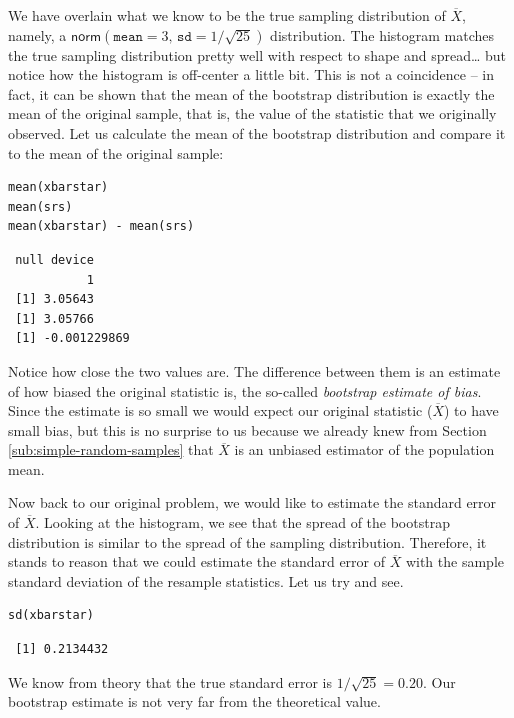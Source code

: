 \documentclass[captions=tableheading]{scrbook}
\begin{document}
\begin{example}
We have overlain what we know to be the true sampling distribution of \(\overline{X}\), namely, a \(\mathsf{norm}(\mathtt{mean}=3,\,\mathtt{sd}=1/\sqrt{25})\) distribution. The histogram matches the true sampling distribution pretty well with respect to shape and spread\ldots{} but notice how the histogram is off-center a little bit. This is not a coincidence -- in fact, it can be shown that the mean of the bootstrap distribution is exactly the mean of the original sample, that is, the value of the statistic that we originally observed. Let us calculate the mean of the bootstrap distribution and compare it to the mean of the original sample:


\begin{verbatim}
mean(xbarstar)
mean(srs)
mean(xbarstar) - mean(srs)
\end{verbatim}

\begin{verbatim}
 null device 
           1
 [1] 3.05643
 [1] 3.05766
 [1] -0.001229869
\end{verbatim}

\end{example}

Notice how close the two values are. The difference between them is an estimate of how biased the original statistic is, the so-called \emph{bootstrap estimate of bias}. Since the estimate is so small we would expect our original statistic (\(\overline{X}\)) to have small bias, but this is no surprise to us because we already knew from Section \ref{sub:simple-random-samples} that \(\overline{X}\) is an unbiased estimator of the population mean.

Now back to our original problem, we would like to estimate the standard error of \(\overline{X}\). Looking at the histogram, we see that the spread of the bootstrap distribution is similar to the spread of the sampling distribution. Therefore, it stands to reason that we could estimate the standard error of \(\overline{X}\) with the sample standard deviation of the resample statistics. Let us try and see.


\begin{verbatim}
sd(xbarstar)
\end{verbatim}

\begin{verbatim}
 [1] 0.2134432
\end{verbatim}

We know from theory that the true standard error is \(1/\sqrt{25}=0.20\). Our bootstrap estimate is not very far from the theoretical value. 
\end{document}

